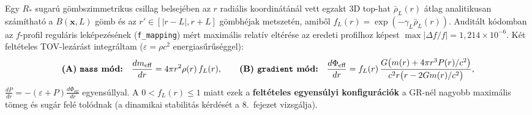 \documentclass[10pt,a4paper]{article}
\begin{document}
\par
Egy $R_*$ sugar\'u g\"ombszimmetrikus csillag belsej\'eben az $r$ radi\'alis koordin\'at\'an\'al vett egzakt 3D top-hat $\bar{\rho}_L(r)$ \'atlag analitikusan sz\'am\'ithat\'o a $B(\mathbf{x},L)$ g\"omb \'es az $r' \in [|r-L|, r+L]$ g\"ombh\'ejak metszet\'en, amib\H{o}l $f_L(r) = \exp(-\gamma_L\bar{\rho}_L(r))$. Audit\'alt k\'odomban az $f$-profil regul\'aris lek\'epez\'es\'enek (\texttt{f\_mapping}) m\'ert maxim\'alis relat\'iv elt\'er\'ese az eredeti profilhoz k\'epest \textbf{$\max|\Delta f/f| = 1{,}214\times 10^{-6}$}. K\'et felt\'eteles TOV-lez\'ar\'ast integr\'altam ($\varepsilon = \rho c^2$ energias\H{u}r\H{u}s\'eggel):
\begin{equation}
  \textbf{(A) \texttt{mass} m\'od:}\quad \frac{dm_{\text{eff}}}{dr} = 4\pi r^2 \rho(r)\,f_L(r), \qquad
  \textbf{(B) \texttt{gradient} m\'od:}\quad \frac{d\Phi_{\text{eff}}}{dr} = f_L(r)\,\frac{G\bigl(m(r) + 4\pi r^3 P(r)/c^2\bigr)}{c^2 r\bigl(r - 2Gm(r)/c^2\bigr)},
\end{equation}
$\frac{dP}{dr} = -(\varepsilon + P)\frac{d\Phi_{\text{eff}}}{dr}$ egyens\'ullyal. A $0 < f_L(r) \le 1$ miatt ezek a \textbf{felt\'eteles egyens\'ulyi konfigur\'aci\'ok} a GR-n\'el nagyobb maxim\'alis t\"omeg \'es sug\'ar fel\'e tol\'odnak (a dinamikai stabilit\'as k\'erd\'es\'et a 8.\ fejezet vizsg\'alja).
\end{document}
